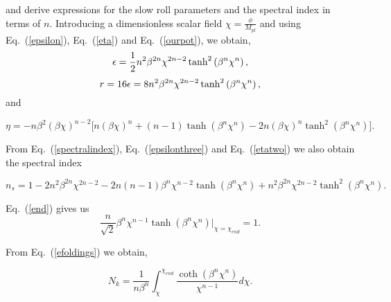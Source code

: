 \documentclass[prd,twocolumn,superscriptaddress]{revtex4}
\begin{document}
% 
and  derive expressions for the slow roll parameters and the spectral index in terms of $n$. Introducing a
dimensionless scalar field $\chi = \frac{\phi}{M_{pl}}$ and
using Eq.~(\ref{epsilon}), Eq.~(\ref{eta}) and Eq.~(\ref{ourpot}), we obtain,
\begin{equation}
\epsilon = \frac{1}{2} n^2 \beta^{2n} \chi^{2n - 2} \tanh^2 \left( \beta^n \chi^n \right) \\ \label{epsilonthree},
\end{equation}
\begin{equation}
r = 16 \epsilon = 8 n^2 \beta^{2n} \chi^{2n - 2} \tanh^2 \left( \beta^n \chi^n \right) \\ \label{ttsrthree},
\end{equation}
and

\begin{widetext}
\begin{equation}
\eta = - n \beta^2 {\left(\beta \chi \right)}^{n - 2}
\Big[
n {\left( \beta \chi \right)}^n
+ (n - 1) \tanh \left( \beta^n \chi^n \right)
- 2n {\left( \beta \chi \right)}^{n} \tanh^2 \left( \beta^n \chi^n \right)
\Big] \label{etatwo}  .
\end{equation}
\end{widetext}

\newpage

From Eq.~(\ref{spectralindex}), Eq.~(\ref{epsilonthree}) and Eq.~(\ref{etatwo}) we also obtain the spectral index


\begin{widetext}
\begin{equation}
n_s = 1 - 2 n^2 \beta^{2n} \chi^{2n - 2} - 2n (n - 1) \beta^n \chi^{n - 2} \tanh \left( \beta^n \chi^n \right)
+ n^2 \beta^{2n} \chi^{2n - 2} \tanh^2 \left( \beta^n \chi^n \right) . \label{ns}
\end{equation}
\end{widetext}


Eq.~(\ref{end}) gives us
\begin{equation}
\frac{n}{\sqrt{2}} \beta^n \chi^{n - 1} \tanh \left( \beta^n \chi^n \right)|_{\chi= \chi_{end}} = 1. \label{constraint1}
\end{equation}

From Eq.~(\ref{efoldings}) we obtain,

\begin{equation}
N_k = \frac{1}{n \beta^n}
\int_{\chi}^{\chi_{end}}{\frac{\coth \left( \beta^n \chi^n \right)}{\chi^{n - 1}} d \chi}.
\end{equation}
\end{document}

